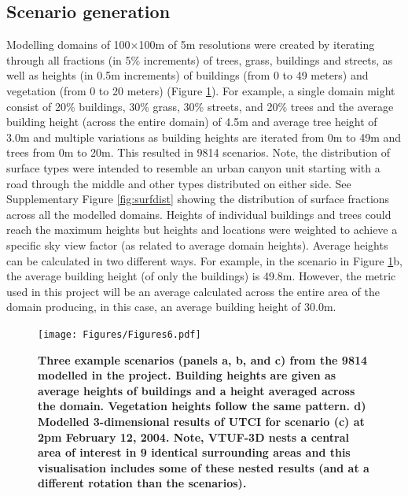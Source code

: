 \documentclass[final,3p,times,authoryear]{elsarticle}
\begin{document}
\subsection{Scenario generation}\label{sec:methodsgen}
Modelling domains of 100$\times$100m of 5m resolutions were created by iterating through all fractions (in 5\% increments) of trees, grass, buildings and streets, as well as heights (in 0.5m increments) of buildings (from 0 to 49 meters) and vegetation (from 0 to 20 meters) (Figure \ref{fig:scenarios}). For example, a single domain might consist of 20\% buildings, 30\% grass, 30\% streets, and 20\% trees and the average building height (across the entire domain) of 4.5m and average tree height of 3.0m and multiple variations as building heights are iterated from 0m to 49m and trees from 0m to 20m. This resulted in 9814 scenarios. Note, the distribution of surface types were intended to resemble an urban canyon unit starting with a road through the middle and other types distributed on either side. See Supplementary Figure \ref{fig:surfdist} showing the distribution of surface fractions across all the modelled domains. Heights of individual buildings and trees could reach the maximum heights but heights and locations were weighted to achieve a specific sky view factor (as related to average domain heights). Average heights can be calculated in two different ways. For example, in the scenario in Figure \ref{fig:scenarios}b, the average building height (of only the buildings) is 49.8m. However, the metric used in this project will be an average calculated across the entire area of the domain producing, in this case, an average building height of 30.0m.

\begin{figure}
\centering
\texttt{[image: Figures/Figures6.pdf]}
\caption{\bf Three example scenarios (panels a, b, and c) from the 9814 modelled in the project. Building heights are given as average heights of buildings and a height averaged across the domain. Vegetation heights follow the same pattern. d) Modelled 3-dimensional results of UTCI for scenario (c) at 2pm February 12, 2004. Note, VTUF-3D nests a central area of interest in 9 identical surrounding areas and this visualisation includes some of these nested results (and at a different rotation than the scenarios). }
 \label{fig:scenarios}
\end{figure} 
\end{document}
